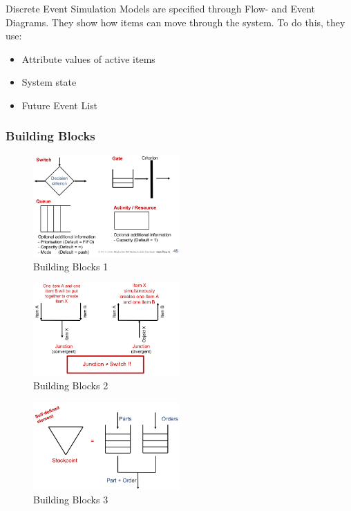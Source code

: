 Discrete Event Simulation Models are specified through Flow- and
Event Diagrams. They show how items can move through the system.
To do this, they use:

\begin{itemize}
\tightlist
\item Attribute values of active items
\item System state
\item Future Event List
\end{itemize}


\subsubsection{Building Blocks}

\begin{figure}[H]
\centering
\includegraphics[width=0.5\textwidth]{figures/flowDiagramBuildingblocks1.png}
\caption{Building Blocks 1}
\end{figure}

\begin{figure}[H]
\centering
\includegraphics[width=0.5\textwidth]{figures/flowDiagramBuildingblocks2.png}
\caption{Building Blocks 2}
\end{figure}

\begin{figure}[H]
\centering
\includegraphics[width=0.5\textwidth]{figures/flowDiagramBuildingblocks3.png}
\caption{Building Blocks 3}
\end{figure}

